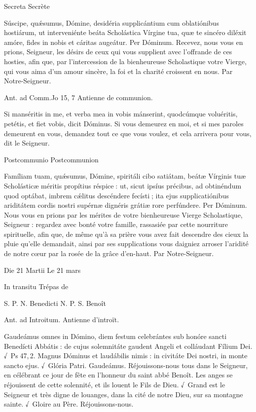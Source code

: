\begin{paracol}{2}
Secreta
\switchcolumn
Secrète
\switchcolumn*

Súscipe, quǽsumus, Dómine,  desidéria supplicántium cum oblatiónibus hostiárum, ut interveniénte beáta Scholástica Vírgine tua, quæ te sincéro diléxit amóre, fides in nobis et cáritas augeátur. Per Dóminum.
\switchcolumn
Recevez, nous vous en prions, Seigneur,  les désirs de ceux qui vous supplient avec l’offrande de ces hosties, afin que, par l’intercession de la bienheureuse Scholastique votre Vierge, qui vous aima d’un amour sincère, la foi et la charité croissent en nous. Par Notre-Seigneur.
\switchcolumn*

Ant. ad Comm.\hfill Jo 15, 7
\switchcolumn
Antienne de communion.
\switchcolumn*

Si manséritis in me, et verba mea in vobis mánserint, quodcúmque voluéritis, petétis, et fiet vobis, dicit Dóminus.
\switchcolumn
Si vous demeurez en moi, et si mes paroles demeurent en vous, demandez tout ce que vous voulez, et cela arrivera pour vous, dit le Seigneur.
\switchcolumn*

Postcommunio
\switchcolumn
Postcommunion
\switchcolumn*

Famíliam tuam, quǽsumus, Dómine, spiritáli cibo satiátam, beátæ Vírginis tuæ Scholásticæ méritis propítius réspice : ut, sicut ipsíus précibus, ad obtinéndum quod optábat, imbrem cǽlitus descéndere fecísti ; ita ejus supplicatiónibus ariditátem cordis nostri supérnæ dignéris grátiæ rore perfúndere. Per Dóminum.
\switchcolumn
Nous vous en prions par les mérites de votre bienheureuse Vierge Scholastique, Seigneur : regardez avec bonté votre famille, rassasiée par cette nourriture spirituelle, afin que, de même qu’à sa prière vous avez fait descendre des cieux la pluie qu’elle demandait, ainsi par ses supplications vous daigniez arroser l’aridité de notre cœur par la rosée de la grâce d’en-haut. Par Notre-Seigneur.
\switchcolumn*

Die 21 Martii
\switchcolumn
Le 21 mars
\switchcolumn*

In transitu
\switchcolumn
Trépas de
\switchcolumn*

S. P. N. Benedicti
\switchcolumn
N. P. S. Benoît
\switchcolumn*

Ant. ad Introitum.
\switchcolumn
Antienne d’introït.
\switchcolumn*

Gaudeámus omnes in Dómino,  diem festum celebrántes sub honóre sancti Benedícti Abbátis : de cujus solemnitáte gaudent Angeli et colláudant Fílium Dei. √~Ps 47, 2. Magnus Dóminus et laudábilis nimis : in civitáte Dei nostri, in monte sancto ejus. √~Glória Patri. Gaudeámus.
\switchcolumn
Réjouissons-nous tous dans le Seigneur,  en célébrant ce jour de fête en l’honneur du saint abbé Benoît. Les anges se réjouissent de cette solennité, et ils louent le Fils de Dieu. √~Grand est le Seigneur et très digne de louanges, dans la cité de notre Dieu, sur sa montagne sainte. √~Gloire au Père. Réjouissons-nous.
\switchcolumn*


\end{paracol}
